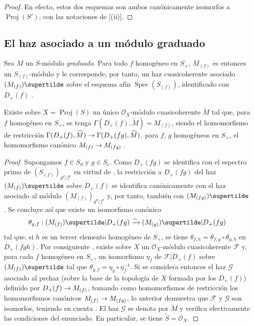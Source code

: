 \documentclass[oneside,10pt]{amsart}
\makeatletter
\newcommand{\ega@arrow}[2]{\mathchoice{#1}{#2}{#2}{#2}}
\renewcommand{\to}{\ega@arrow{\longrightarrow}{\rightarrow}}
\newcommand{\oldpage}[2][]{\marginnote{\normalfont\footnotesize\textbf{#1}~|~#2}\ignorespaces}
\let\EGAOriginalLabel\label
\renewcommand{\label}[1]{\phantomsection\EGAOriginalLabel{#1}}
\makeatother
\begin{document}
\begin{proof}
En efecto, estos dos esquemas son ambos canónicamente isomorfos a $\operatorname{Proj}(S')$, con las notaciones de [(ii)].
\end{proof}

\subsection{El haz asociado a un módulo graduado}
\label{subsection:II.2.5-fr}

\begin{env}[2.5.1]
\label{II.2.5.1-fr}
Sea $M$ un $S$-módulo \emph{graduado}.
Para todo $f$ homogéneo en $S_+$, $M_{(f)}$ es entonces un $S_{(f)}$-módulo y le corresponde, por tanto, un haz cuasicoherente asociado $(M_{(f)})\supertilde$ sobre el esquema afín $\operatorname{Spec}(S_{(f)})$, identificado con $D_+(f)$ .
\end{env}

\oldpage[II]{31}
\begin{proposition}[2.5.2]
\label{II.2.5.2-fr}
Existe sobre $X=\operatorname{Proj}(S)$ un único $\mathcal{O}_X$-módulo cuasicoherente $\widetilde{M}$ tal que, para $f$ homogéneo en $S_+$, se tenga $\Gamma(D_+(f),\widetilde{M})=M_{(f)}$, siendo el homomorfismo de restricción $\Gamma(D_+(f),\widetilde{M})\to
\Gamma(D_+(fg),\widetilde{M})$, para $f$, $g$ homogéneos en $S_+$, el homomorfismo canónico $M_{(f)}\to M_{(fg)}$ .
\end{proposition}

\begin{proof}
Supongamos $f\in S_d$ y $g\in S_e$.
Como $D_+(fg)$ se identifica con el espectro primo de $(S_{(f)})_{g^d/f^e}$ en virtud de , la restricción a $D_+(fg)$ del haz $(M_{(f)})\supertilde$ sobre $D_+(f)$ se identifica canónicamente con el haz asociado al módulo $(M_{(f)})_{g^d/f^e}$  y, por tanto, también con $(M_{(fg)})\supertilde$ .
Se concluye así que existe un isomorfismo canónico
\[
  \theta_{g,f}:(M_{(f)})\supertilde|D_+(fg)
  \xrightarrow{\sim}(M_{(g)})\supertilde|D_+(fg)
\]
tal que, si $h$ es un tercer elemento homogéneo de $S_+$, se tiene $\theta_{f,h}=\theta_{f,g}\circ\theta_{g,h}$ en $D_+(fgh)$.
Por consiguiente , existe sobre $X$ un $\mathcal{O}_X$-módulo cuasicoherente $\mathcal{F}$ y, para cada $f$ homogéneo en $S_+$, un isomorfismo $\eta_f$ de $\mathcal{F}|D_+(f)$ sobre $(M_{(f)})\supertilde$ tal que $\theta_{g,f}=\eta_g\circ\eta_f^{-1}$.
Si se considera entonces el haz $\mathcal{G}$ asociado al prehaz (sobre la base de la topología de $X$ formada por los $D_+(f)$) definido por $D_+(f)\to M_{(f)}$, tomando como homomorfismos de restricción los homomorfismos canónicos $M_{(f)}\to M_{(fg)}$, lo anterior demuestra que $\mathcal{F}$ y $\mathcal{G}$ son isomorfos, teniendo en cuenta .
El haz $\mathcal{G}$ se denota por $\widetilde{M}$ y verifica efectivamente las condiciones del enunciado.
En particular, se tiene $\widetilde{S}=\mathcal{O}_X$.
\end{proof}
\end{document}

